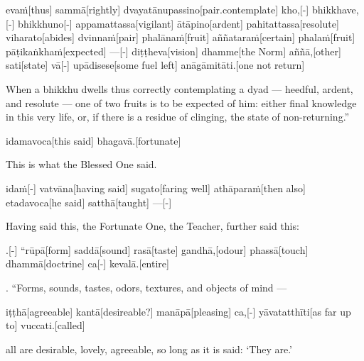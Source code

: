 \begin{samepage}
\begingl[glneveryline={\PaliGlossA,\PaliGlossB}]
evaṁ[thus] sammā[rightly] dvayatānupassino[pair.contemplate] kho,[-] bhikkhave,[-] bhikkhuno[-] appamattassa[vigilant] ātāpino[ardent] pahitattassa[resolute] viharato[abides] dvinnaṁ[pair] phalānaṁ[fruit] aññataraṁ[certain] phalaṁ[fruit] pāṭikaṅkhaṁ[expected] —[-] diṭṭheva[vision] dhamme[the Norm] aññā,[other] sati[state] vā[-] upādisese[some fuel left] anāgāmitāti.[one not return]
\endgl
\nopagebreak
\linespread{0.5}
\begin{spacin}{0.2}
{\PaliGlossFT When a bhikkhu dwells thus correctly contemplating a dyad — heedful, ardent, and resolute — one of two fruits is to be expected of him: either final knowledge in this very life, or, if there is a residue of clinging, the state of non-returning.”}
\end{spacin}
\vskip 12pt
\end{samepage}
\begin{samepage}
\begingl[glneveryline={\PaliGlossA,\PaliGlossB}]
idamavoca[this said] bhagavā.[fortunate]
\endgl
\nopagebreak
\linespread{0.5}
\begin{spacin}{0.2}
{\PaliGlossFT This is what the Blessed One said.}
\end{spacin}
\vskip 12pt
\end{samepage}
\begin{samepage}
\begingl[glneveryline={\PaliGlossA,\PaliGlossB}]
idaṁ[-] vatvāna[having said] sugato[faring well] athāparaṁ[then also] etadavoca[he said] satthā[taught] —[-]
\endgl
\nopagebreak
\linespread{0.5}
\begin{spacin}{0.2}
{\PaliGlossFT Having said this, the Fortunate One, the Teacher, further said this:}
\end{spacin}
\vskip 12pt
\end{samepage}
\vskip 0.2in
\begin{samepage}
.[-] “rūpā[form] saddā[sound] rasā[taste] gandhā,[odour] phassā[touch] dhammā[doctrine] ca[-] kevalā.[entire]
\endgl
\nopagebreak
\linespread{0.5}
\begin{spacin}{0.2}
{. “Forms, sounds, tastes, odors, textures, and objects of mind —}
\end{spacin}
\vskip 12pt
\end{samepage}
\begin{samepage}
\begingl[glneveryline={\PaliGlossA,\PaliGlossB}]
iṭṭhā[agreeable] kantā[desireable?] manāpā[pleasing] ca,[-] yāvatatthīti[as far up to] vuccati.[called]
\endgl
\nopagebreak
\linespread{0.5}
\begin{spacin}{0.2}
{\PaliGlossFT all are desirable, lovely, agreeable, so long as it is said: ‘They are.’}
\end{spacin}
\vskip 12pt
\end{samepage}

